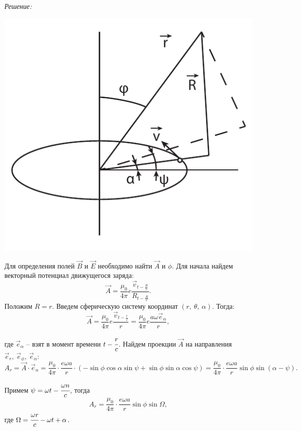 \vspace*{2em}
\emph{Решение:}

\begin{minipage}{.45\textwidth}
    \includegraphics[width=\textwidth]{orbit}
\end{minipage}
\begin{minipage}{.5\textwidth}
    Для определения полей \( \vec{B} \) и \( \vec{E} \) необходимо найти
    \( \vec{A} \) и \( \phi \). Для начала найдем векторный потенциал
    движущегося заряда:
    \[
        \vec{A} = \frac{\mu_0}{4\pi}e\frac{\vec{v}_{t - \frac{R}{c}}}{R_{t - \frac{R}{c}}}.
    \]
    Положим \( R = r \). Введем сферическую систему координат \( (r,\ \theta,\ 
    \alpha) \). Тогда:
    \[
        \vec{A} = \frac{\mu_0}{4\pi}e\frac{\vec{v}_{t - \frac{r}{c}}}{r} =
        \frac{\mu_0}{4\pi}e\frac{a\omega\vec{e}_\alpha}{r},
    \]
\end{minipage}
где \( \vec{e}_\alpha \) -- взят в момент времени \( t - \cfrac{r}{c} \). Найдем
проекции \( \vec{A} \) на направления \( \vec{e}_r,\ \vec{e}_\phi,\ 
\vec{e}_\alpha \):
\[
    A_r = \vec{A}\cdot\vec{e}_n = \frac{\mu_0}{4\pi}\cdot\frac{e\omega a}{r}
    \cdot(-\sin\phi\cos\alpha\sin\psi + \sin\phi\sin\alpha\cos\psi) =
    \frac{\mu_0}{4\pi}\cdot\frac{e\omega a}{r}\sin\phi\sin(\alpha - \psi).
\]

Примем \( \psi = \omega t - \cfrac{\omega n}{c} \), тогда
\[
    A_r = \frac{\mu_0}{4\pi}\cdot\frac{e\omega a}{r}\sin\phi\sin\Omega,
\]
где \( \Omega = \cfrac{\omega r}{c} - \omega t + \alpha \).

